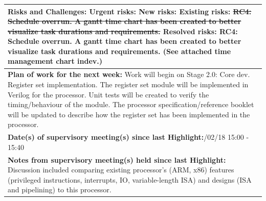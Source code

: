 \documentclass[11pt,a4paper]{article}
\begin{document}
\begin{table}[H]
\begin{tabularx}{\textwidth}{|X|}
	\\ \hline
	\textbf{Risks and Challenges:}\newline
	{\color{red} Urgent risks:}\newline
	{\color{orange} New risks:}\newline
	{\color{purple} Existing risks:\newline
	\sout{RC4: Schedule overrun. A gantt time chart has been created to better visualize task durations and requirements.}}\newline
	{\color{gray} Resolved risks:\newline
	RC4: Schedule overrun. A gantt time chart has been created to better visualize task durations and requirements. (See attached time management chart indev.)}\newline
	\\ \hline
	\textbf{Plan of work for the next week:}\newline
	Work will begin on Stage 2.0: Core dev. Register set implementation.\newline\newline
	The register set module will be implemented in Verilog for the processor. Unit tests will be created to verify the timing/behaviour of the module.
	\newline
	The processor specification/reference booklet will be updated to describe how the register set has been implemented in the processor.
	
	\\ \hline
	\textbf{Date(s) of supervisory meeting(s) since last Highlight:}\newline
	08/02/18 15:00 - 15:40
	\\ \hline
	\textbf{Notes from supervisory meeting(s) held since last Highlight:}\newline
	Discussion included comparing existing processor's (ARM, x86) features (privileged instructions, interrupts, IO, variable-length ISA) and designs (ISA and pipelining) to this processor.
	\\ \hline
    \end{tabularx}
\end{table}
\end{document}
